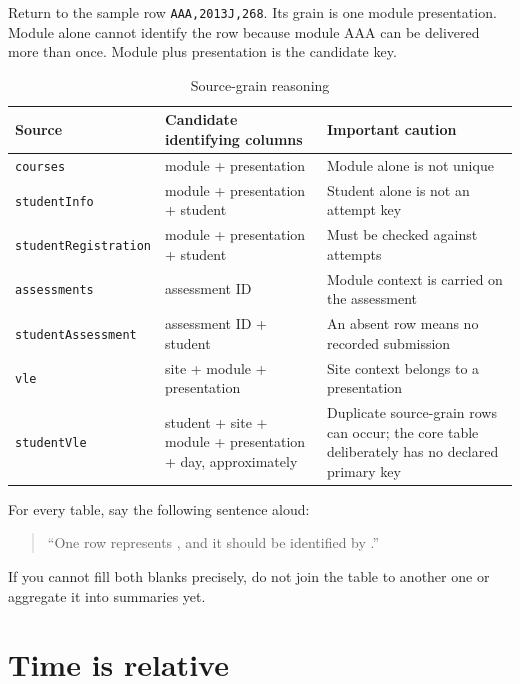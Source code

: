 Return to the sample row \texttt{AAA,2013J,268}. Its grain is one module
presentation. Module alone cannot identify the row because module AAA can be
delivered more than once. Module plus presentation is the candidate key.

\begin{table}[htbp]
\centering
\caption{Source-grain reasoning}
\label{tab:source-grains}
\begin{tabularx}{\textwidth}{L{0.25\textwidth}L{0.34\textwidth}Y}
\toprule
Source & Candidate identifying columns & Important caution \\
\midrule
\texttt{courses} & module + presentation & Module alone is not unique \\
\texttt{studentInfo} & module + presentation + student & Student alone is not an attempt key \\
\texttt{studentRegistration} & module + presentation + student & Must be checked against attempts \\
\texttt{assessments} & assessment ID & Module context is carried on the assessment \\
\texttt{studentAssessment} & assessment ID + student & An absent row means no recorded submission \\
\texttt{vle} & site + module + presentation & Site context belongs to a presentation \\
\texttt{studentVle} & student + site + module + presentation + day, approximately & Duplicate source-grain rows can occur; the core table deliberately has no declared primary key \\
\bottomrule
\end{tabularx}
\end{table}

\begin{validationbox}
For every table, say the following sentence aloud:

\begin{quote}
``One row represents \underline{\hspace{4cm}}, and it should be identified by
\underline{\hspace{4cm}}.''
\end{quote}

If you cannot fill both blanks precisely, do not join the table to another one
or aggregate it into summaries yet.
\end{validationbox}

\section{Time is relative}

